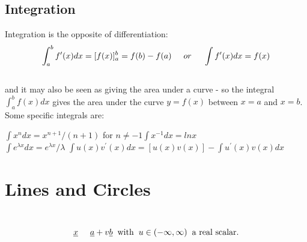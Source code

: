 \documentclass{report}
\begin{document}
\subsection{Integration}
Integration is the opposite of differentiation:
\begin{equation}
	\int^{b}_{a} f^{\prime}(x)dx = [f(x)]^{b}_{a} = f(b) - f(a) \hspace{0.5cm} or \hspace{0.5cm} \int f^{\prime}(x)dx = f(x)
\end{equation}\\
and it may also be seen as giving the area under a curve - so the integral $\int^{b}_{a}f(x)dx$ gives the area under the curve $y = f(x)$ between $x = a$ and $x = b$. Some specific integrals are:
\begin{center}
$\int x^n dx = x^{n+1}/(n+1)$ for $n \neq -1$\hspace{1cm}$\int x^{-1}dx=ln x$\\

$\int e^{\lambda x}dx = e^{\lambda x} /\lambda$\hspace{1cm} $\int u(x)v^{\prime}(x)dx = [u(x)v(x)]-\int u^{\prime}(x)v(x)dx$
\end{center}

\section{Lines and Circles}
\\
\begin{equation}
\underline{x}\hspace{5mm}\underline{a} + v\underline{b}\hspace{2mm}\text{with} \hspace{2mm}u \in (-\infty,\infty)\hspace{2mm}\text{a real scalar.}
\end{equation}
\newpage
\end{document}
